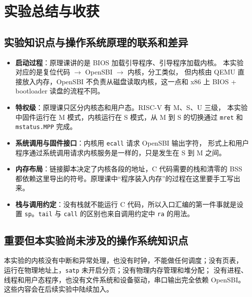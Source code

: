 \documentclass[UTF8,a4paper,10pt,fontset=none]{ctexart}
\begin{document}
\section{实验总结与收获}
\subsection{实验知识点与操作系统原理的联系和差异}
\begin{itemize}
    \item \textbf{启动过程}：原理课讲的是 BIOS 加载引导程序、引导程序加载内核。
          本实验对应的是复位代码 $\rightarrow$ OpenSBI $\rightarrow$ 内核，分工类似，
          但内核由 QEMU 直接放入内存，OpenSBI 不负责从磁盘读取内核，这一点和 x86 上
          BIOS + bootloader 读盘的流程不同。
    \item \textbf{特权级}：原理课只区分内核态和用户态。RISC-V 有 M、S、U 三级，
          本实验中固件运行在 M 模式，内核运行在 S 模式，从 M 到 S 的切换通过
          \texttt{mret} 和 \texttt{mstatus.MPP} 完成。
    \item \textbf{系统调用与固件接口}：内核用 \texttt{ecall} 请求 OpenSBI 输出字符，
          形式上和用户程序通过系统调用请求内核服务是一样的，只是发生在 S 到 M 之间。
    \item \textbf{内存布局}：链接脚本决定了内核各段的地址，C 代码需要的栈和清零的 BSS
          都依赖这里导出的符号。原理课中“程序装入内存”的过程在这里要手工写出来。
    \item \textbf{栈与调用约定}：没有栈就不能运行 C 代码，所以入口汇编的第一件事就是设置
          \texttt{sp}。\texttt{tail} 与 \texttt{call} 的区别也来自调用约定中 \texttt{ra} 的用法。
\end{itemize}

\subsection{重要但本实验尚未涉及的操作系统知识点}
本实验的内核没有中断和异常处理，也没有时钟，不能做任何调度；没有页表，
运行在物理地址上，\texttt{satp} 未开启分页；没有物理内存管理和堆分配；
没有进程、线程和用户态程序，也没有文件系统和设备驱动，串口输出完全依赖 OpenSBI。
这些内容会在后续实验中陆续加入。
\end{document}

